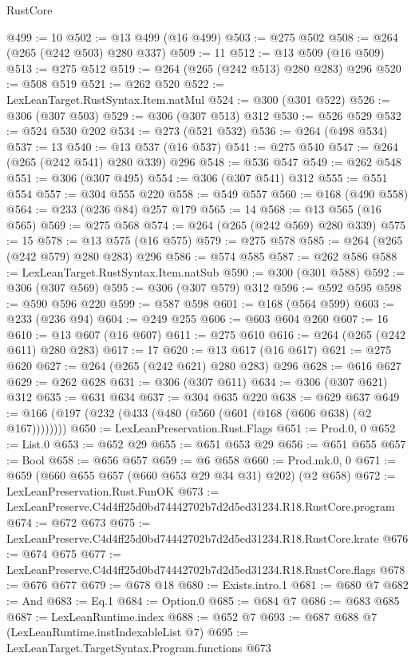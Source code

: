 \begin{lexlean}{RustCore}
\begin{coremodule}
@499 := 10
@502 := @13 @499 (@16 @499)
@503 := @275 @502
@508 := @264 (@265 (@242 @503) @280 @337)
@509 := 11
@512 := @13 @509 (@16 @509)
@513 := @275 @512
@519 := @264 (@265 (@242 @513) @280 @283) @296
@520 := @508 @519
@521 := @262 @520
@522 := LexLeanTarget.RustSyntax.Item.natMul
@524 := @300 (@301 @522)
@526 := @306 (@307 @503)
@529 := @306 (@307 @513) @312
@530 := @526 @529
@532 := @524 @530 @202
@534 := @273 (@521 @532)
@536 := @264 (@498 @534)
@537 := 13
@540 := @13 @537 (@16 @537)
@541 := @275 @540
@547 := @264 (@265 (@242 @541) @280 @339) @296
@548 := @536 @547
@549 := @262 @548
@551 := @306 (@307 @495)
@554 := @306 (@307 @541) @312
@555 := @551 @554
@557 := @304 @555 @220
@558 := @549 @557
@560 := @168 (@490 @558)
@564 := @233 (@236 @84) @257 @179
@565 := 14
@568 := @13 @565 (@16 @565)
@569 := @275 @568
@574 := @264 (@265 (@242 @569) @280 @339)
@575 := 15
@578 := @13 @575 (@16 @575)
@579 := @275 @578
@585 := @264 (@265 (@242 @579) @280 @283) @296
@586 := @574 @585
@587 := @262 @586
@588 := LexLeanTarget.RustSyntax.Item.natSub
@590 := @300 (@301 @588)
@592 := @306 (@307 @569)
@595 := @306 (@307 @579) @312
@596 := @592 @595
@598 := @590 @596 @220
@599 := @587 @598
@601 := @168 (@564 @599)
@603 := @233 (@236 @94)
@604 := @249 @255
@606 := @603 @604 @260
@607 := 16
@610 := @13 @607 (@16 @607)
@611 := @275 @610
@616 := @264 (@265 (@242 @611) @280 @283)
@617 := 17
@620 := @13 @617 (@16 @617)
@621 := @275 @620
@627 := @264 (@265 (@242 @621) @280 @283) @296
@628 := @616 @627
@629 := @262 @628
@631 := @306 (@307 @611)
@634 := @306 (@307 @621) @312
@635 := @631 @634
@637 := @304 @635 @220
@638 := @629 @637
@649 := @166 (@197 (@232 (@433 (@480 (@560 (@601 (@168 (@606 @638) (@2 @167))))))))
@650 := LexLeanPreservation.Rust.Flags
@651 := Prod.{0, 0}
@652 := List.{0}
@653 := @652 @29
@655 := @651 @653 @29
@656 := @651 @655
@657 := Bool
@658 := @656 @657
@659 := @6 @658
@660 := Prod.mk.{0, 0}
@671 := @659 (@660 @655 @657 (@660 @653 @29 @34 @31) @202) (@2 @658)
@672 := LexLeanPreservation.Rust.FunOK
@673 := LexLeanPreserve.C4d4ff25d0bd74442702b7d2d5ed31234.R18.RustCore.program
@674 := @672 @673
@675 := LexLeanPreserve.C4d4ff25d0bd74442702b7d2d5ed31234.R18.RustCore.krate
@676 := @674 @675
@677 := LexLeanPreserve.C4d4ff25d0bd74442702b7d2d5ed31234.R18.RustCore.flags
@678 := @676 @677
@679 := @678 @18
@680 := Exists.intro.{1}
@681 := @680 @7
@682 := And
@683 := Eq.{1}
@684 := Option.{0}
@685 := @684 @7
@686 := @683 @685
@687 := LexLeanRuntime.index
@688 := @652 @7
@693 := @687 @688 @7 (LexLeanRuntime.instIndexableList @7)
@695 := LexLeanTarget.TargetSyntax.Program.functions @673

\end{coremodule}
\end{lexlean}
